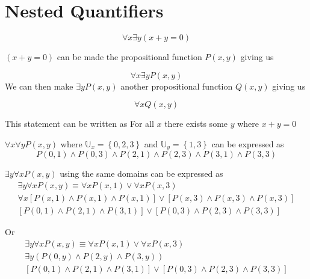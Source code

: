 \documentclass[12pt letter]{report}
\begin{document}
\pagebreak
\section{Nested Quantifiers}


\[
  \forall x \exists y \left( x + y = 0 \right)
\]

$ \left( x + y = 0 \right)  $ can be made the propositional function $P \left( x, y \right) $ giving us

\[
  \forall x \exists y P \left( x, y \right)
\]
We can then make $\exists y P \left( x, y \right) $ another propositional function $Q \left( x, y \right) $ giving us

\[
  \forall x Q \left( x, y \right)
\]

This statement can be written as For all $x$ there exists some $y$ where $x + y = 0$

\noindent $\forall x \forall y P \left( x, y \right) $ where $\mathbb{U}_{x} = \left\{ 0, 2, 3 \right\} $ and $\mathbb{U}_{y} =
  \left\{ 1,3 \right\} $ can be expressed as
\[
  P \left( 0,1 \right)  \wedge P \left( 0,3 \right) \wedge P \left( 2,1 \right)  \wedge P \left( 2,3 \right)  \wedge P
  \left( 3,1 \right)  \wedge P \left( 3,3 \right)
\]

\noindent $\exists y \forall x P \left( x,y \right) $ using the same domains can be expressed as
\begin{align*}
  \exists y \forall x P \left( x,y \right) \equiv \forall x P \left( x,1 \right)  \vee \forall x P \left( x,3
  \right)                                                                                         \\
  \forall x \left[ P \left( x, 1 \right) \wedge  P \left( x, 1 \right) \wedge  P \left( x,1 \right)    \right]  \vee
  \left[ P \left( x,3 \right) \wedge  P \left( x,3 \right) \wedge P \left( x,3 \right)    \right] \\
  \left[ P \left( 0,1 \right) \wedge  P \left( 2,1 \right) \wedge P \left( 3,1 \right)    \right]  \vee
  \left[ P \left( 0,3 \right) \wedge  P \left( 2,3 \right) \wedge  P \left( 3,3 \right)    \right]
\end{align*}


Or
\begin{align*}
  \exists y \forall x P \left( x,y \right) \equiv \forall x P \left( x,1 \right)  \vee \forall x P \left( x,3 \right)
  \\
  \exists y \left( P \left( 0, y \right) \wedge P \left( 2, y \right) \wedge P \left( 3, y \right)    \right) \\
  \left[ P \left( 0,1 \right) \wedge P \left( 2, 1 \right) \wedge P \left( 3, 1 \right)  \right] \vee \left[ P \left(
    0,3\right) \wedge P \left( 2,3 \right) \wedge P \left( 3,3 \right)     \right]
\end{align*}
\end{document}
